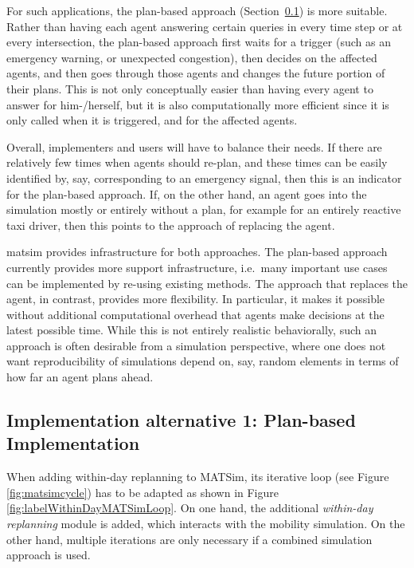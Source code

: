 For such applications, the plan-based approach (Section~\ref{sec:impl-plan-based}) is more suitable.  Rather than having each agent answering certain queries in every time step or at every intersection, the plan-based approach first waits for a trigger (such as an emergency warning, or unexpected congestion), then decides on the affected agents, and then goes through those agents and changes the future portion of their plans.   This is not only conceptually easier than having every agent to answer for him-/herself, but it is also computationally more efficient since it is only called when it is triggered, and for the affected agents. 

Overall, implementers and users will have to balance their needs.  
%
If there are relatively few times when agents should re-plan, and these times can be easily identified by, say, corresponding to an emergency signal, then this is an indicator for the plan-based approach.  
%
If, on the other hand, an agent goes into the simulation mostly or entirely without a plan, for example for an entirely reactive taxi driver, then this points to the approach of replacing the agent.

\acrshort{matsim} provides infrastructure for both approaches.  The plan-based approach currently provides more support infrastructure, i.e.\ many important use cases can be implemented by re-using existing methods.  The approach that replaces the agent, in contrast, provides more flexibility.  In particular, it makes it possible without additional computational overhead that agents make decisions at the latest possible time.  While this is not entirely realistic behaviorally, such an approach is often desirable from a simulation perspective, where one does not want reproducibility of simulations depend on, say, random elements in terms of how far an agent plans ahead.



\subsection{Implementation alternative 1: Plan-based Implementation}
\label{sec:impl-plan-based}

When adding within-day replanning to MATSim, its iterative loop (see Figure \ref{fig:matsimcycle}) has to be adapted as shown in Figure \ref{fig:labelWithinDayMATSimLoop}. On one hand, the additional \emph{within-day replanning} module is added, which interacts with the mobility simulation. On the other hand, multiple iterations are only necessary if a combined simulation approach is used.

